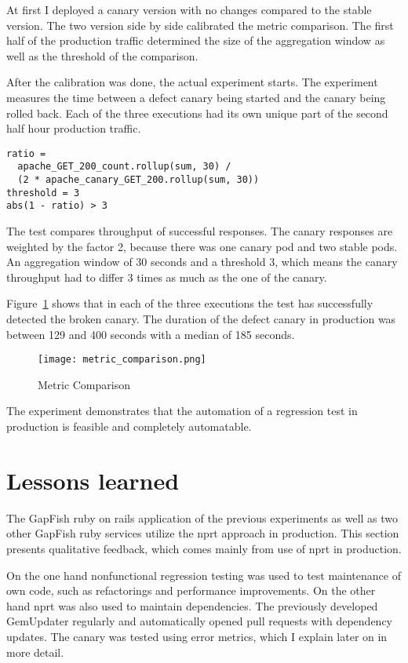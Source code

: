 At first I deployed a canary version with no changes compared to the stable version. The
two version side by side calibrated the metric comparison. The first half of the
production traffic determined the size of the aggregation window as well as the threshold
of the comparison.

After the calibration was done, the actual experiment starts. The experiment measures the
time between a defect canary being started and the canary being rolled back. Each
of the three executions had its own unique part of the second half hour production traffic.

\begin{verbatim}
ratio =
  apache_GET_200_count.rollup(sum, 30) /
  (2 * apache_canary_GET_200.rollup(sum, 30))
threshold = 3
abs(1 - ratio) > 3
\end{verbatim}

The test compares throughput of successful responses. The canary responses are weighted by
the factor 2, because there was one canary pod and two stable pods. An aggregation window
of 30 seconds and a threshold 3, which means the canary throughput had to differ 3 times
as much as the one of the canary.

Figure~\ref{fig:metric_comparison} shows that in each of the three executions the test has
successfully detected the broken canary. The duration of the defect canary in production
was between 129 and 400 seconds with a median of 185 seconds.

\begin{figure}[htbp]
  \centering
  \texttt{[image: metric\_comparison.png]}
  \caption[Metric Comparison]{Metric Comparison}
  \label{fig:metric_comparison}
\end{figure}

The experiment demonstrates that the automation of a regression test in production is
feasible and completely automatable.

\section{Lessons learned}

The GapFish ruby on rails application of the previous experiments as well as two other
GapFish ruby services utilize the \gls{nprt} approach in production. This section presents
qualitative feedback, which comes mainly from use of \gls{nprt} in production.

On the one hand nonfunctional regression testing was used to test maintenance of own code,
such as refactorings and performance improvements. On the other hand \gls{nprt} was also
used to maintain dependencies. The previously developed GemUpdater regularly and
automatically opened pull requests with dependency updates. The canary was tested using
error metrics, which I explain later on in more detail.

